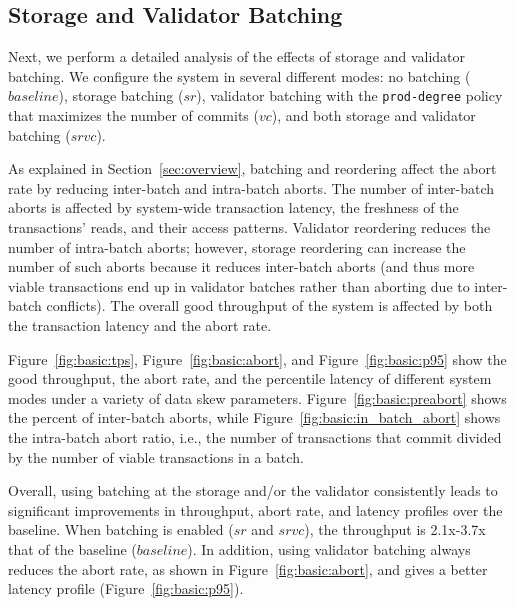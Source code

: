 \subsection{Storage and Validator Batching}
\label{subsec:experiment:batching}

Next, we perform a detailed analysis of the effects of storage and validator batching. We configure the system in several different modes: no batching ($baseline$), storage batching ($sr$), validator batching with the \texttt{prod-degree} policy that maximizes the number of commits ($vc$), and both storage and validator batching ($srvc$).


As explained in Section~\ref{sec:overview}, batching and reordering affect the abort rate by reducing inter-batch and intra-batch aborts. The number of inter-batch aborts is affected by system-wide transaction latency, the freshness of the transactions' reads, and their access patterns. Validator reordering reduces the number of intra-batch aborts; however, storage reordering can increase the number of such aborts because it reduces inter-batch aborts (and thus more viable transactions end up in validator batches rather than aborting due to inter-batch conflicts). The overall good throughput of the system is affected by both the transaction latency and the abort rate. 


Figure~\ref{fig:basic:tps}, Figure~\ref{fig:basic:abort}, and Figure~\ref{fig:basic:p95} show the good throughput, the abort rate, and the percentile latency of different system modes under a variety of data skew parameters. Figure~\ref{fig:basic:preabort} shows the percent of inter-batch aborts, while Figure~\ref{fig:basic:in_batch_abort} shows the intra-batch abort ratio, i.e., the number of transactions that commit divided by the number of viable transactions in a batch.


Overall, using batching at the storage and/or the validator consistently leads to significant improvements in throughput, abort rate, and latency profiles over the baseline. When batching is enabled ($sr$ and $srvc$), the throughput is 2.1x-3.7x that of the baseline ($baseline$). In addition, using validator batching always reduces the abort rate, as shown in Figure~\ref{fig:basic:abort}, and gives a better latency profile (Figure~\ref{fig:basic:p95}).

